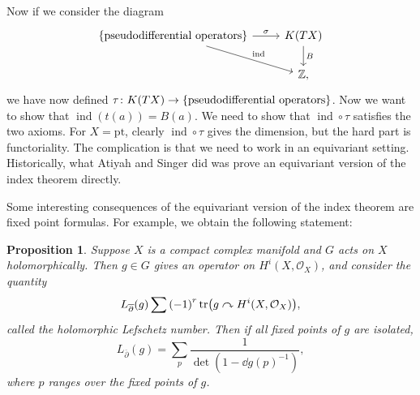 \documentclass[leqno, openany]{memoir}
\newtheorem{prop}[thm]{Proposition}
\theoremstyle{definition}
\theoremstyle{remark}
\theoremstyle{plain}
\theoremstyle{definition}
\theoremstyle{remark}
\newcommand{\Z}{\mathbb{Z}}
\newcommand{\mc}[1]{\mathcal{#1}}
\newcommand{\mr}[1]{\mathrm{#1}}
\newcommand{\ol}[1]{\overline{#1}}
\DeclareMathOperator{\ind}{ind}
\begin{document}
Now if we consider the diagram
\begin{equation*}
\begin{tikzcd}
    \qty{\text{pseudodifferential operators}} \ar{r}{\sigma} \ar{dr}{\ind} & K(TX) \ar{d}{B} \\
                                                                           & \Z,
\end{tikzcd}
\end{equation*}
we have now defined $\tau \colon K(TX) \to \qty{\text{pseudodifferential operators}}$. Now we want to show that $\ind(t(a)) = B(a)$. We need to show that $\ind \circ \tau$ satisfies the two axioms. For $X = \mr{pt}$, clearly $\ind \circ \tau$ gives the dimension, but the hard part is functoriality. The complication is that we need to work in an equivariant setting. Historically, what Atiyah and Singer did was prove an equivariant version of the index theorem directly.

Some interesting consequences of the equivariant version of the index theorem are fixed point formulas. For example, we obtain the following statement:
\begin{prop}
    Suppose $X$ is a compact complex manifold and $G$ acts on $X$ holomorphically. Then $g \in G$ gives an operator on $H^i(X, \mc{O}_X)$, and consider the quantity
    \[ L_{\ol{\partial}}(g) \sum {(-1)}^r \tr(g \curvearrowright H^i(X, \mc{O}_X)), \]
    called the \textit{holomorphic Lefschetz number}. Then if all fixed points of $g$ are isolated,
    \[ L_{\ol{\partial}}(g) = \sum_p \frac{1}{\det(1-{\dd{g}(p)}^{-1})}, \]
    where $p$ ranges over the fixed points of $g$.
\end{prop}
\end{document}
